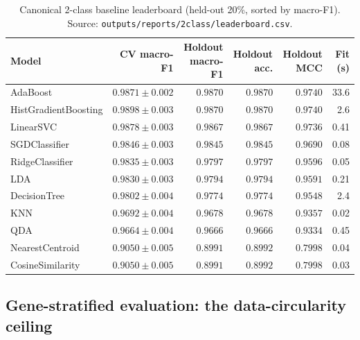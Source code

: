 \documentclass[11pt,a4paper]{article}
\begin{document}
\begin{table}[H]
\centering
\caption{Canonical 2-class baseline leaderboard (held-out 20\%, sorted by macro-F1).
Source: \texttt{outputs/reports/2class/leaderboard.csv}.}
\label{tab:canonical-2class}
\small
\begin{tabular}{lrrrrr}
\toprule
Model & CV macro-F1 & Holdout macro-F1 & Holdout acc. & Holdout MCC & Fit (s) \\
\midrule
AdaBoost             & $0.9871\pm0.002$ & $0.9870$ & $0.9870$ & $0.9740$ & 33.6 \\
HistGradientBoosting & $0.9898\pm0.003$ & $0.9870$ & $0.9870$ & $0.9740$ & 2.6 \\
LinearSVC            & $0.9878\pm0.003$ & $0.9867$ & $0.9867$ & $0.9736$ & 0.41 \\
SGDClassifier        & $0.9846\pm0.003$ & $0.9845$ & $0.9845$ & $0.9690$ & 0.08 \\
RidgeClassifier      & $0.9835\pm0.003$ & $0.9797$ & $0.9797$ & $0.9596$ & 0.05 \\
LDA                  & $0.9830\pm0.003$ & $0.9794$ & $0.9794$ & $0.9591$ & 0.21 \\
DecisionTree         & $0.9802\pm0.004$ & $0.9774$ & $0.9774$ & $0.9548$ & 2.4 \\
KNN                  & $0.9692\pm0.004$ & $0.9678$ & $0.9678$ & $0.9357$ & 0.02 \\
QDA                  & $0.9664\pm0.004$ & $0.9666$ & $0.9666$ & $0.9334$ & 0.45 \\
NearestCentroid      & $0.9050\pm0.005$ & $0.8991$ & $0.8992$ & $0.7998$ & 0.04 \\
CosineSimilarity     & $0.9050\pm0.005$ & $0.8991$ & $0.8992$ & $0.7998$ & 0.03 \\
\bottomrule
\end{tabular}
\end{table}

\subsection{Gene-stratified evaluation: the data-circularity ceiling}
\label{sec:gene-strat}
\end{document}
